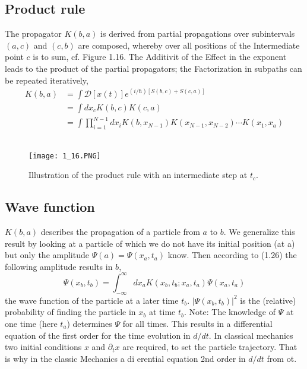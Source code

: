 \subsection{Product rule}
The propagator $K (b, a)$ is derived from partial propagations over subintervals
$(a, c)$ and $(c, b)$ are composed, whereby over all positions of the
Intermediate point $c$ is to sum, cf. Figure  1.16. The Additivit of the
Effect in the exponent leads to the product of the partial propagators; the
Factorization in subpaths can be repeated iteratively,
\\
\begin{equation}
\begin{split}
K(b,a)&
=\int \mathcal{D}[x(t)] e^{(i / \hbar)[S(b, c)+S(c, a)]} \\
&=\int d x_{c} K(b, c) K(c, a) \\ 
&=\int \prod_{i=1}^{N-1} d x_{i} K\left(b, x_{N-1}\right) K\left(x_{N-1}, x_{N-2}\right) \cdots K\left(x_{1}, x_{a}\right)
\end{split}
\end{equation}\\

\begin{figure}[ht]
    \centering
    \texttt{[image: 1\_16.PNG]}
    \caption{Illustration of the product rule with an intermediate step at $t_c$.}
    \label{fig:1.16}
\end{figure}
\subsection{Wave function}
$K (b, a)$ describes the propagation of a particle from $a$ to $b$. We generalize
this result by looking at a particle of which
we do not have its initial position (at a) but only the amplitude $\Psi(a) = \Psi(x_a, t_a)$ know. Then according to (1.26) the following amplitude results in $b$,
\begin{equation}
\Psi\left(x_{b}, t_{b}\right)=\int_{-\infty}^{\infty} d x_{a} K\left(x_{b}, t_{b} ; x_{a}, t_{a}\right) \Psi\left(x_{a}, t_{a}\right)
\end{equation}
the wave function of the particle at a later time $t_b$. $|\Psi (x_b, t_b)|^2$
is the (relative) probability of finding the particle in $x_b$ at time $t_b$.
Note: The knowledge of $\Psi$ at one time (here $t_a$) determines $\Psi$ for all times.
This results in a differential equation of the first order for the time evolution
in $d / dt$.
In classical mechanics two initial conditions $x$ and $\partial_t x$ are required,
to set the particle trajectory. That is why in the classic
Mechanics a di erential equation 2nd order in $d / dt$ from ot.

